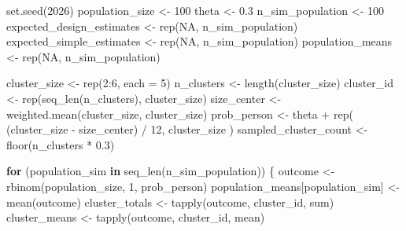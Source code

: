 \documentclass[
  spanish,
  11pt,
  letterpaper,
  oneside,
  open=any]{scrbook}
\newenvironment{Shaded}{\begin{snugshade}}{\end{snugshade}}
\newcommand{\AttributeTok}[1]{\textcolor[rgb]{0.40,0.45,0.13}{#1}}
\newcommand{\ConstantTok}[1]{\textcolor[rgb]{0.56,0.35,0.01}{#1}}
\newcommand{\ControlFlowTok}[1]{\textcolor[rgb]{0.00,0.23,0.31}{\textbf{#1}}}
\newcommand{\DecValTok}[1]{\textcolor[rgb]{0.68,0.00,0.00}{#1}}
\newcommand{\FloatTok}[1]{\textcolor[rgb]{0.68,0.00,0.00}{#1}}
\newcommand{\FunctionTok}[1]{\textcolor[rgb]{0.28,0.35,0.67}{#1}}
\newcommand{\NormalTok}[1]{\textcolor[rgb]{0.00,0.23,0.31}{#1}}
\newcommand{\OtherTok}[1]{\textcolor[rgb]{0.00,0.23,0.31}{#1}}
\newcommand{\SpecialCharTok}[1]{\textcolor[rgb]{0.37,0.37,0.37}{#1}}
\begin{document}
\begin{Shaded}
\begin{Highlighting}[]
\FunctionTok{set.seed}\NormalTok{(}\DecValTok{2026}\NormalTok{)}
\NormalTok{population\_size }\OtherTok{\textless{}{-}} \DecValTok{100}
\NormalTok{theta }\OtherTok{\textless{}{-}} \FloatTok{0.3}
\NormalTok{n\_sim\_population }\OtherTok{\textless{}{-}} \DecValTok{100}
\NormalTok{expected\_design\_estimates }\OtherTok{\textless{}{-}} \FunctionTok{rep}\NormalTok{(}\ConstantTok{NA}\NormalTok{, n\_sim\_population)}
\NormalTok{expected\_simple\_estimates }\OtherTok{\textless{}{-}} \FunctionTok{rep}\NormalTok{(}\ConstantTok{NA}\NormalTok{, n\_sim\_population)}
\NormalTok{population\_means }\OtherTok{\textless{}{-}} \FunctionTok{rep}\NormalTok{(}\ConstantTok{NA}\NormalTok{, n\_sim\_population)}

\NormalTok{cluster\_size }\OtherTok{\textless{}{-}} \FunctionTok{rep}\NormalTok{(}\DecValTok{2}\SpecialCharTok{:}\DecValTok{6}\NormalTok{, }\AttributeTok{each =} \DecValTok{5}\NormalTok{)}
\NormalTok{n\_clusters }\OtherTok{\textless{}{-}} \FunctionTok{length}\NormalTok{(cluster\_size)}
\NormalTok{cluster\_id }\OtherTok{\textless{}{-}} \FunctionTok{rep}\NormalTok{(}\FunctionTok{seq\_len}\NormalTok{(n\_clusters), cluster\_size)}
\NormalTok{size\_center }\OtherTok{\textless{}{-}} \FunctionTok{weighted.mean}\NormalTok{(cluster\_size, cluster\_size)}
\NormalTok{prob\_person }\OtherTok{\textless{}{-}}\NormalTok{ theta }\SpecialCharTok{+} \FunctionTok{rep}\NormalTok{(}
\NormalTok{  (cluster\_size }\SpecialCharTok{{-}}\NormalTok{ size\_center) }\SpecialCharTok{/} \DecValTok{12}\NormalTok{,}
\NormalTok{  cluster\_size}
\NormalTok{)}
\NormalTok{sampled\_cluster\_count }\OtherTok{\textless{}{-}} \FunctionTok{floor}\NormalTok{(n\_clusters }\SpecialCharTok{*} \FloatTok{0.3}\NormalTok{)}

\ControlFlowTok{for}\NormalTok{ (population\_sim }\ControlFlowTok{in} \FunctionTok{seq\_len}\NormalTok{(n\_sim\_population)) \{}
\NormalTok{  outcome }\OtherTok{\textless{}{-}} \FunctionTok{rbinom}\NormalTok{(population\_size, }\DecValTok{1}\NormalTok{, prob\_person)}
\NormalTok{  population\_means[population\_sim] }\OtherTok{\textless{}{-}} \FunctionTok{mean}\NormalTok{(outcome)}
\NormalTok{  cluster\_totals }\OtherTok{\textless{}{-}} \FunctionTok{tapply}\NormalTok{(outcome, cluster\_id, sum)}
\NormalTok{  cluster\_means }\OtherTok{\textless{}{-}} \FunctionTok{tapply}\NormalTok{(outcome, cluster\_id, mean)}


\end{Highlighting}
\end{Shaded}
\end{document}
